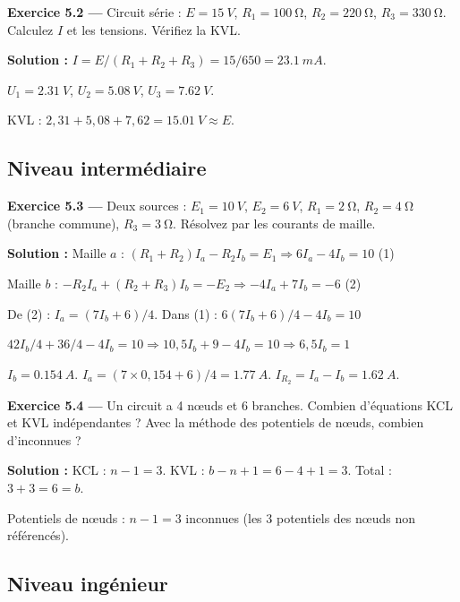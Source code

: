 \documentclass[12pt,a4paper,twoside]{book}
\begin{document}
\textbf{Exercice 5.2 ---} Circuit série : $E = \SI{15}{V}$, $R_1 = \SI{100}{\ohm}$, $R_2 = \SI{220}{\ohm}$, $R_3 = \SI{330}{\ohm}$. Calculez $I$ et les tensions. Vérifiez la KVL.

\begin{pratique}
\textbf{Solution :} $I = E/(R_1+R_2+R_3) = 15/650 = \SI{23.1}{mA}$.

$U_1 = \SI{2.31}{V}$, $U_2 = \SI{5.08}{V}$, $U_3 = \SI{7.62}{V}$.

KVL : $2{,}31+5{,}08+7{,}62 = \SI{15.01}{V} \approx E$. \checkmark
\end{pratique}

\subsection*{Niveau intermédiaire}

\textbf{Exercice 5.3 ---} Deux sources : $E_1 = \SI{10}{V}$, $E_2 = \SI{6}{V}$, $R_1 = \SI{2}{\ohm}$, $R_2 = \SI{4}{\ohm}$ (branche commune), $R_3 = \SI{3}{\ohm}$. Résolvez par les courants de maille.

\begin{pratique}
\textbf{Solution :} Maille $a$ : $(R_1+R_2)I_a - R_2 I_b = E_1 \Rightarrow 6I_a - 4I_b = 10$ \quad (1)

Maille $b$ : $-R_2 I_a + (R_2+R_3)I_b = -E_2 \Rightarrow -4I_a + 7I_b = -6$ \quad (2)

De (2) : $I_a = (7I_b + 6)/4$. Dans (1) : $6(7I_b+6)/4 - 4I_b = 10$

$42I_b/4 + 36/4 - 4I_b = 10 \Rightarrow 10{,}5I_b + 9 - 4I_b = 10 \Rightarrow 6{,}5I_b = 1$

$I_b = \SI{0.154}{A}$. $I_a = (7\times0{,}154+6)/4 = \SI{1.77}{A}$. $I_{R_2} = I_a - I_b = \SI{1.62}{A}$.
\end{pratique}

\textbf{Exercice 5.4 ---} Un circuit a 4 n\oe uds et 6 branches. Combien d'équations KCL et KVL indépendantes ? Avec la méthode des potentiels de n\oe uds, combien d'inconnues ?

\begin{pratique}
\textbf{Solution :} KCL : $n-1 = 3$. KVL : $b-n+1 = 6-4+1 = 3$. Total : $3+3 = 6 = b$. \checkmark

Potentiels de n\oe uds : $n-1 = 3$ inconnues (les 3 potentiels des n\oe uds non référencés).
\end{pratique}

\subsection*{Niveau ingénieur}
\end{document}
